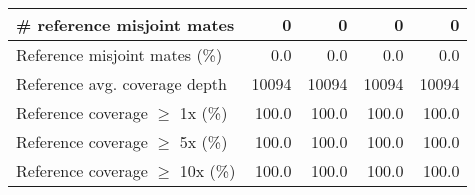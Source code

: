 \documentclass[12pt,a4paper]{article}
\begin{document}
\begin{table}[ht]
\begin{center}
\begin{tabular}{|l*{4}{|r}|}
\# reference misjoint mates & 0 & 0 & 0 & 0 \\ \hline
Reference misjoint mates (\%) & 0.0 & 0.0 & 0.0 & 0.0 \\ \hline
Reference avg. coverage depth & 10094 & 10094 & 10094 & 10094 \\ \hline
Reference coverage $\geq$ 1x (\%) & 100.0 & 100.0 & 100.0 & 100.0 \\ \hline
Reference coverage $\geq$ 5x (\%) & 100.0 & 100.0 & 100.0 & 100.0 \\ \hline
Reference coverage $\geq$ 10x (\%) & 100.0 & 100.0 & 100.0 & 100.0 \\ \hline
\end{tabular}
\end{center}
\end{table}
\end{document}
